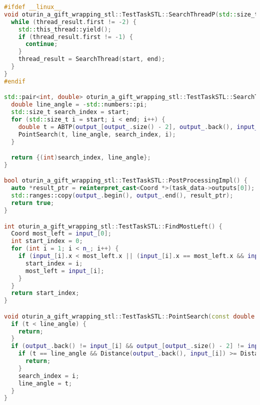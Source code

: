 \documentclass[12pt,a4paper]{extarticle}
\begin{document}
\begin{lstlisting}[language=C++]
#ifdef __linux__
void oturin_a_gift_wrapping_stl::TestTaskSTL::SearchThreadP(std::size_t start, std::size_t end, std::pair<int, double> &thread_result) {
  while (thread_result.first != -2) {
    std::this_thread::yield();
    if (thread_result.first != -1) {
      continue;
    }
    thread_result = SearchThread(start, end);
  }
}
#endif

std::pair<int, double> oturin_a_gift_wrapping_stl::TestTaskSTL::SearchThread(std::size_t start, std::size_t end) {
  double line_angle = -std::numbers::pi;
  std::size_t search_index = start;
  for (std::size_t i = start; i < end; i++) {
    double t = ABTP(output_[output_.size() - 2], output_.back(), input_[i]);
    PointSearch(t, line_angle, search_index, i);
  }

  return {(int)search_index, line_angle};
}

bool oturin_a_gift_wrapping_stl::TestTaskSTL::PostProcessingImpl() {
  auto *result_ptr = reinterpret_cast<Coord *>(task_data->outputs[0]);
  std::ranges::copy(output_.begin(), output_.end(), result_ptr);
  return true;
}

int oturin_a_gift_wrapping_stl::TestTaskSTL::FindMostLeft() {
  Coord most_left = input_[0];
  int start_index = 0;
  for (int i = 1; i < n_; i++) {
    if (input_[i].x < most_left.x || (input_[i].x == most_left.x && input_[i].y > most_left.y)) {
      start_index = i;
      most_left = input_[i];
    }
  }
  return start_index;
}

void oturin_a_gift_wrapping_stl::TestTaskSTL::PointSearch(const double t, double &line_angle, std::size_t &search_index, const std::size_t i) {
  if (t < line_angle) {
    return;
  }
  if (output_.back() != input_[i] && output_[output_.size() - 2] != input_[i]) {
    if (t == line_angle && Distance(output_.back(), input_[i]) >= Distance(output_.back(), input_[search_index])) {
      return;
    }
    search_index = i;
    line_angle = t;
  }
}
\end{lstlisting}
\end{document}
